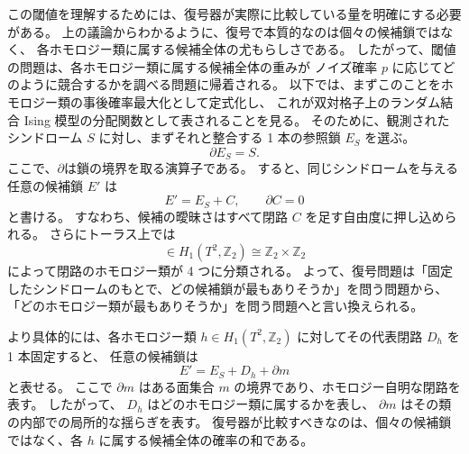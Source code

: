 \documentclass[../master.tex]{subfiles}
\begin{document}
この閾値を理解するためには、復号器が実際に比較している量を明確にする必要がある。
上の議論からわかるように、復号で本質的なのは個々の候補鎖ではなく、
各ホモロジー類に属する候補全体の尤もらしさである。
したがって、閾値の問題は、各ホモロジー類に属する候補全体の重みが
ノイズ確率 \(p\) に応じてどのように競合するかを調べる問題に帰着される。
以下では、まずこのことをホモロジー類の事後確率最大化として定式化し、
これが双対格子上のランダム結合 Ising 模型の分配関数として表されることを見る。
そのために、観測されたシンドローム \(S\) に対し、まずそれと整合する 1 本の参照鎖 \(E_S\) を選ぶ。
\begin{equation}
    \partial E_S=S.
\end{equation}
ここで、\(\partial\)は鎖の境界を取る演算子である。
すると、同じシンドロームを与える任意の候補鎖 \(E'\) は
\begin{equation}
    E'=E_S+C,\qquad \partial C=0
\end{equation}
と書ける。
すなわち、候補の曖昧さはすべて閉路 \(C\) を足す自由度に押し込められる。
さらにトーラス上では
\begin{equation}
    [C]\in H_1(T^2,\mathbb Z_2)\cong \mathbb Z_2\times \mathbb Z_2
\end{equation}
によって閉路のホモロジー類が 4 つに分類される。
よって、復号問題は「固定したシンドロームのもとで、どの候補鎖が最もありそうか」を問う問題から、
「どのホモロジー類が最もありそうか」を問う問題へと言い換えられる。

より具体的には、各ホモロジー類 \(h\in H_1(T^2,\mathbb Z_2)\) に対してその代表閉路 \(D_h\) を 1 本固定すると、
任意の候補鎖は
\begin{equation}
    E'=E_S+D_h+\partial m
\end{equation}
と表せる。
ここで \(\partial m\) はある面集合 \(m\) の境界であり、ホモロジー自明な閉路を表す。
したがって、
\(D_h\) はどのホモロジー類に属するかを表し、
\(\partial m\) はその類の内部での局所的な揺らぎを表す。
復号器が比較すべきなのは、個々の候補鎖ではなく、各 \(h\) に属する候補全体の確率の和である。
\end{document}
